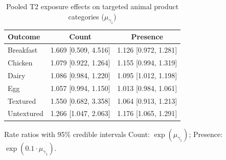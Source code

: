 \begin{table}[H]
\centering
\caption{Pooled T2 exposure effects on targeted animal product categories ($\mu_{\gamma_1}$)}
\label{tab:a2_t2_mu_gamma}
\begin{tabular}{lcc}
\toprule
Outcome & Count & Presence \\
\midrule
Breakfast & 1.669 [0.509, 4.516] & 1.126 [0.972, 1.281] \\
Chicken & 1.079 [0.922, 1.264] & 1.155 [0.994, 1.319] \\
Dairy & 1.086 [0.984, 1.220] & 1.095 [1.012, 1.198] \\
Egg & 1.057 [0.994, 1.150] & 1.013 [0.984, 1.061] \\
Textured & 1.550 [0.682, 3.358] & 1.064 [0.913, 1.213] \\
Untextured & 1.266 [1.047, 2.063] & 1.176 [1.065, 1.291] \\
\bottomrule
\end{tabular}
\par\smallskip\footnotesize Rate ratios with 95\% credible intervals Count: $\exp(\mu_{\gamma_1})$; Presence: $\exp(0.1 \cdot \mu_{\gamma_1})$.
\end{table}
